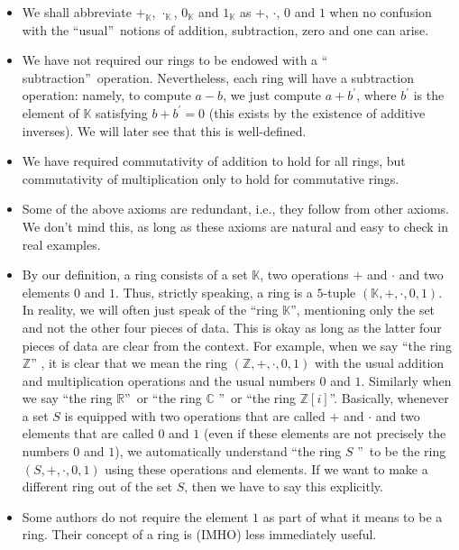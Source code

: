 \documentclass[numbers=enddot,12pt,final,onecolumn,notitlepage]{scrartcl}%
\numberwithin{exer}{subsection}
\theoremstyle{definition}
\begin{document}
\begin{itemize}
\item We shall abbreviate $+_{\mathbb{K}}$, $\cdot_{\mathbb{K}}$,
$0_{\mathbb{K}}$ and $1_{\mathbb{K}}$ as $+$, $\cdot$, $0$ and $1$ when no
confusion with the \textquotedblleft usual\textquotedblright\ notions of
addition, subtraction, zero and one can arise.

\item We have not required our rings to be endowed with a \textquotedblleft
subtraction\textquotedblright\ operation. Nevertheless, each ring will have a
subtraction operation: namely, to compute $a-b$, we just compute $a+b^{\prime
}$, where $b^{\prime}$ is the element of $\mathbb{K}$ satisfying $b+b^{\prime
}=0$ (this exists by the existence of additive inverses). We will later see
that this is well-defined.

\item We have required commutativity of addition to hold for all rings, but
commutativity of multiplication only to hold for commutative rings.

\item Some of the above axioms are redundant, i.e., they follow from other
axioms. We don't mind this, as long as these axioms are natural and easy to
check in real examples.

\item By our definition, a ring consists of a set $\mathbb{K}$, two operations
$+$ and $\cdot$ and two elements $0$ and $1$. Thus, strictly speaking, a ring
is a $5$-tuple $\left(  \mathbb{K},+,\cdot,0,1\right)  $. In reality, we will
often just speak of the \textquotedblleft ring $\mathbb{K}$\textquotedblright,
mentioning only the set and not the other four pieces of data. This is okay as
long as the latter four pieces of data are clear from the context. For
example, when we say \textquotedblleft the ring $\mathbb{Z}$\textquotedblright%
, it is clear that we mean the ring $\left(  \mathbb{Z},+,\cdot,0,1\right)  $
with the usual addition and multiplication operations and the usual numbers
$0$ and $1$. Similarly when we say \textquotedblleft the ring $\mathbb{R}%
$\textquotedblright\ or \textquotedblleft the ring $\mathbb{C}$%
\textquotedblright\ or \textquotedblleft the ring $\mathbb{Z}\left[  i\right]
$\textquotedblright. Basically, whenever a set $S$ is equipped with two
operations that are called $+$ and $\cdot$ and two elements that are called
$0$ and $1$ (even if these elements are not precisely the numbers $0$ and
$1$), we automatically understand \textquotedblleft the ring $S$%
\textquotedblright\ to be the ring $\left(  S,+,\cdot,0,1\right)  $ using
these operations and elements. If we want to make a different ring out of the
set $S$, then we have to say this explicitly.

\item Some authors do not require the element $1$ as part of what it means to
be a ring. Their concept of a ring is (IMHO) less immediately useful.
\end{itemize}
\end{document}
